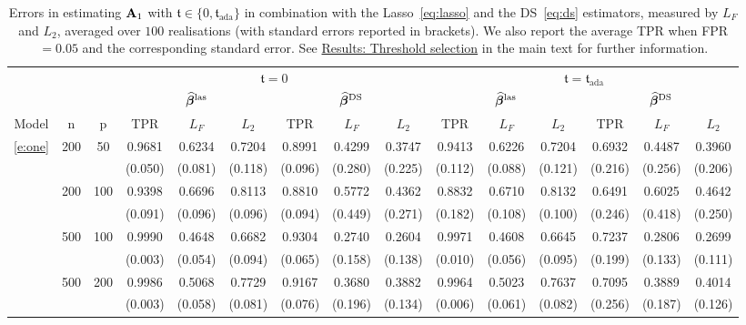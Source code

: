 \begin{table}[htb!]
\caption{Errors in estimating $\mathbf A_1$ with $\mathfrak{t} \in \{0, \mathfrak{t}_{\text{ada}}\}$ in combination with the Lasso~\eqref{eq:lasso} and the DS~\eqref{eq:ds} estimators, measured by $L_F$ and $L_2$, averaged over $100$ realisations (with standard errors reported in brackets). 
We also report the average TPR when FPR $= 0.05$ and the corresponding standard error.
See \hyperref[sec:sim:order]{Results: Threshold selection} in the main text for further information.} 
\label{table:thresholdbeta}
\centering
\resizebox{\columnwidth}{!}
{\scriptsize 
\begin{tabular}{ccc cccccc cccccc}
\toprule 
 &  &  & \multicolumn{6}{c}{$\mathfrak{t} = 0$} &  \multicolumn{6}{c}{$\mathfrak{t}=\mathfrak{t}_{\text{ada}}$} \\
 \cmidrule(lr){4-9}\cmidrule(lr){10-15}
 &  &  & \multicolumn{3}{c}{$\widehat{\bm\beta}^{\text{\upshape{las}}}$} & \multicolumn{3}{c}{$\widehat{\bm\beta}^{\text{\upshape{DS}}}$} & \multicolumn{3}{c}{$\widehat{\bm\beta}^{\text{\upshape{las}}}$} & \multicolumn{3}{c}{$\widehat{\bm\beta}^{\text{\upshape{DS}}}$}   \\
 \cmidrule(lr){4-6}\cmidrule(lr){7-9} \cmidrule(lr){10-12} \cmidrule(lr){13-15}
Model & n & p & TPR & $L_F$ & $L_2$ & TPR & $L_F$ & $L_2$ & TPR & $L_F$ & $L_2$ & TPR & $L_F$ & $L_2$ \\
\cmidrule(lr){1-3}\cmidrule(lr){4-9} \cmidrule(lr){10-15}
\ref{e:one} & 200 & 50 & 0.9681 & 0.6234 & 0.7204 & 0.8991 & 0.4299 & 0.3747 & 0.9413 & 0.6226 & 0.7204 & 0.6932 & 0.4487 & 0.3960 \\
 &  &  & (0.050) & (0.081) & (0.118) & (0.096) & (0.280) & (0.225) & (0.112) & (0.088) & (0.121) & (0.216) & (0.256) & (0.206) \\
 & 200 & 100 & 0.9398 & 0.6696 & 0.8113 & 0.8810 & 0.5772 & 0.4362 & 0.8832 & 0.6710 & 0.8132 & 0.6491 & 0.6025 & 0.4642 \\
 &  &  & (0.091) & (0.096) & (0.096) & (0.094) & (0.449) & (0.271) & (0.182) & (0.108) & (0.100) & (0.246) & (0.418) & (0.250) \\
 & 500 & 100 & 0.9990 & 0.4648 & 0.6682 & 0.9304 & 0.2740 & 0.2604 & 0.9971 & 0.4608 & 0.6645 & 0.7237 & 0.2806 & 0.2699 \\
 &  &  & (0.003) & (0.054) & (0.094) & (0.065) & (0.158) & (0.138) & (0.010) & (0.056) & (0.095) & (0.199) & (0.133) & (0.111) \\
 & 500 & 200 & 0.9986 & 0.5068 & 0.7729 & 0.9167 & 0.3680 & 0.3882 & 0.9964 & 0.5023 & 0.7637 & 0.7095 & 0.3889 & 0.4014 \\
 &  &  & (0.003) & (0.058) & (0.081) & (0.076) & (0.196) & (0.134) & (0.006) & (0.061) & (0.082) & (0.256) & (0.187) & (0.126) \\ \midrule

\end{tabular}}
\end{table}
